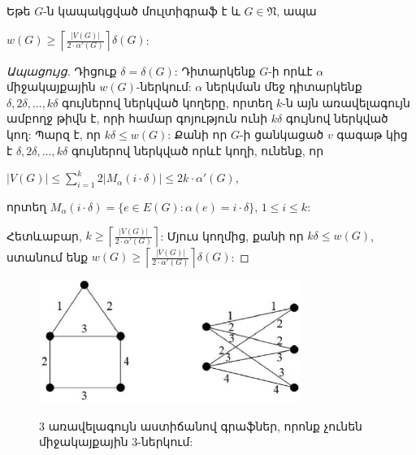 \begin{theorem}
\label{t1_lower_matching_number} Եթե $G$-ն կապակցված մուլտիգրաֆ է և $G\in \mathfrak{N}$, ապա
\begin{center}
$w(G)\geq \left\lceil \frac{\vert V(G)\vert}{2\cdot
\alpha'(G)}\right\rceil\delta(G)$:
\end{center}
\end{theorem}

\begin{proof}[Ապացույց] Դիցուք $\delta=\delta(G)$: Դիտարկենք $G$-ի որևէ $\alpha$ միջակայքային $w(G)$-ներկում: $\alpha$ ներկման մեջ դիտարկենք $\delta,2\delta,\ldots,k\delta$ գույներով ներկված կողերը, որտեղ $k$-ն այն առավելագույն ամբողջ թիվն է, որի համար գոյություն ունի $k\delta$ գույնով ներկված կող:
Պարզ է, որ $k\delta\leq w(G)$: Քանի որ $G$-ի ցանկացած $v$ գագաթ կից է
$\delta,2\delta,\ldots,k\delta$ գույներով ներկված որևէ կողի, ունենք, որ

\begin{center}
$\vert V(G)\vert\leq {\sum\limits_{i=1}^{k}2\vert
M_{\alpha}(i\cdot\delta)\vert}\leq 2k\cdot\alpha'(G)$,
\end{center}
որտեղ $M_{\alpha}(i\cdot\delta)=
\{e \in E(G) : \alpha(e)=i\cdot\delta\}$, $1\leq i\leq k$:

Հետևաբար, $k\geq \left\lceil \frac{\vert V(G)\vert}{2\cdot
\alpha'(G)}\right\rceil$: Մյուս կողմից, քանի որ $k\delta\leq w(G)$,
ստանում ենք $w(G)\geq \left\lceil \frac{\vert V(G)\vert}{2\cdot
\alpha'(G)}\right\rceil\delta(G)$:
\end{proof}

\begin{figure}[h]
\begin{center}
\includegraphics[width=20pc]{figures/W-bound-fig1.eps}\\
\caption{$3$ առավելագույն աստիճանով գրաֆներ, որոնք չունեն միջակայքային $3$-ներկում:}
\label{f1_cubic}
\end{center}
\end{figure}

